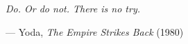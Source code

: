 \thispagestyle{empty}
\vspace*{\fill}

\epigraph{\itshape Do. Or do not. There is no try.}%
{--- Yoda, \textit{The Empire Strikes Back} (1980)}

\vspace*{\fill}
\newpage
